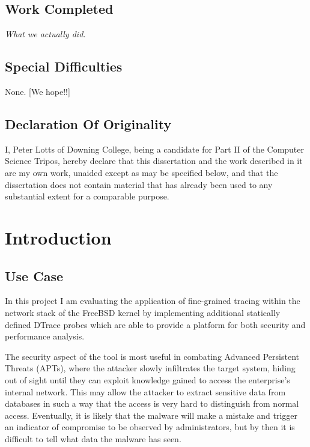 \documentclass[a4paper,12pt,twoside,openright]{report}
\begin{document}
	
	\section*{Work Completed}
	
	\textit{What we actually did.}
	
	\section*{Special Difficulties}
	
	None. [We hope!!]
	
	\newpage
	\section*{Declaration Of Originality}
	
	I, Peter Lotts of Downing College, being a candidate for Part II of
	the Computer Science Tripos, hereby declare
	that this dissertation and the work described in it are my own work,
	unaided except as may be specified below, and that the dissertation
	does not contain material that has already been used to any substantial
	extent for a comparable purpose.
	
	\bigskip
	
	\medskip
	
	\tableofcontents
	
	\listoffigures
	
	
	\pagestyle{headings}
	
	\chapter{Introduction}
	
	\section{Use Case}
	
	In this project I am evaluating the application of fine-grained tracing within the network stack of the FreeBSD kernel by implementing additional statically defined DTrace probes which are able to provide a platform for both security and performance analysis.
	
	The security aspect of the tool is most useful in combating Advanced Persistent Threats (APTs)\cite{Tankard-APT}, where the attacker slowly infiltrates the target system, hiding out of sight until they can exploit knowledge gained to access the enterprise’s internal network. This may allow the attacker to extract sensitive data from databases in such a way that the access is very hard to distinguish from normal access. Eventually, it is likely that the malware will make a mistake and trigger an indicator of compromise to be observed by administrators, but by then it is difficult to tell what data the malware has seen.
	
\end{document}
